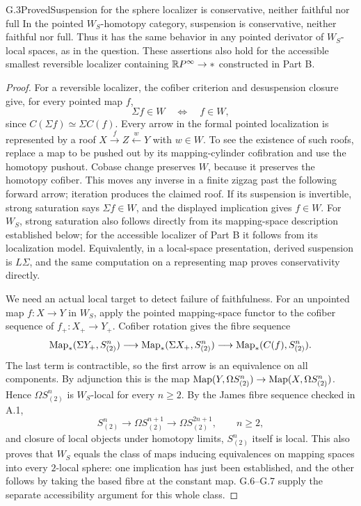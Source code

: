 \begin{claim}{G.3}{Proved}{Suspension for the sphere localizer is conservative, neither faithful nor full}
In the pointed $W_S$-homotopy category, suspension is conservative, neither faithful nor full. Thus it has the same behavior in any pointed derivator of $W_S$-local spaces, as in the question. These assertions also hold for the accessible smallest reversible localizer containing $\mathbb{R}P^\infty\to *$ constructed in Part B.
\end{claim}
\begin{proof}
For a reversible localizer, the cofiber criterion and desuspension closure give, for every pointed map $f$,
\[
 \Sigma f\in W\quad\Longleftrightarrow\quad f\in W,
\]
since $C(\Sigma f)\simeq\Sigma C(f)$. Every arrow in the formal pointed localization is represented by a roof $X\xrightarrow{f}Z\xleftarrow{w}Y$ with $w\in W$. To see the existence of such roofs, replace a map to be pushed out by its mapping-cylinder cofibration and use the homotopy pushout. Cobase change preserves $W$, because it preserves the homotopy cofiber. This moves any inverse in a finite zigzag past the following forward arrow; iteration produces the claimed roof. If its suspension is invertible, strong saturation says $\Sigma f\in W$, and the displayed implication gives $f\in W$. For $W_S$, strong saturation also follows directly from its mapping-space description established below; for the accessible localizer of Part B it follows from its localization model. Equivalently, in a local-space presentation, derived suspension is $L\Sigma$, and the same computation on a representing map proves conservativity directly.

We need an actual local target to detect failure of faithfulness. For an unpointed map $f:X\to Y$ in $W_S$, apply the pointed mapping-space functor to the cofiber sequence of $f_+:X_+\to Y_+$. Cofiber rotation gives the fibre sequence
\[
 \operatorname{Map}_*(\Sigma Y_+,S^n_{(2)})\longrightarrow
 \operatorname{Map}_*(\Sigma X_+,S^n_{(2)})\longrightarrow
 \operatorname{Map}_*(C(f),S^n_{(2)}).
\]
The last term is contractible, so the first arrow is an equivalence on all components. By adjunction this is the map $\operatorname{Map}(Y,\Omega S^n_{(2)})\to\operatorname{Map}(X,\Omega S^n_{(2)})$. Hence $\Omega S^n_{(2)}$ is $W_S$-local for every $n\geq2$. By the James fibre sequence checked in A.1,
\[
 S^n_{(2)}\longrightarrow\Omega S^{n+1}_{(2)}
          \longrightarrow\Omega S^{2n+1}_{(2)},\qquad n\geq2,
\]
and closure of local objects under homotopy limits, $S^n_{(2)}$ itself is local. This also proves that $W_S$ equals the class of maps inducing equivalences on mapping spaces into every $2$-local sphere: one implication has just been established, and the other follows by taking the based fibre at the constant map. G.6--G.7 supply the separate accessibility argument for this whole class.


\end{proof}

